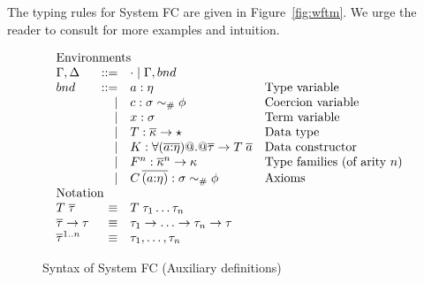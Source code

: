 \documentclass[a4paper,UKenglish]{lipics}
\newcommand{\psim}{\mathrel{\sim_{\tiny \#}}}
\newcommand{\static}{\textsf{$Constraint_{\#}$}}
\newcommand{\ol}[1]{\overline{#1}}
\newcommand{\bnd}{\mathop{bnd}}
\newcommand{\as}{\ol{a}}
\newcommand{\taus}{\ol{\tau}}
\begin{document}
The typing rules for System FC are given in Figure~\ref{fig:wftm}. We
urge the reader to consult \cite{sulzmann+:fc-paper,weirich+:fc2} for
more examples and intuition. 

\begin{figure}\small
\[\begin{array}{l} 
\begin{array}{lrll}
\multicolumn{3}{l}{\text{Environments}} \\
\Gamma,\Delta  & ::= & \cdot \mid \Gamma,\bnd \\
\bnd & ::=   %
             & a : \eta     & \text{Type variable} \\ 
     & \mid  & c : \sigma \psim \phi    & \text{Coercion variable}\\ 
     & \mid  & x : \sigma   & \text{Term variable}\\ 
     & \mid  & T : \ol{\kappa} \to \star & \text{Data type} \\
     & \mid  & K : \forall (\ol{a{:}\eta}) @.@ \taus \to T\;\as   & \text{Data constructor} \\
     & \mid  & F^n : \ol{\kappa}^n \to \kappa & \text{Type families (of arity $n$)} \\
     & \mid  & C \,\ol{(a{:}\eta)} : \sigma \psim \phi & \text{Axioms} \\
\multicolumn{3}{l}{\text{Notation}} \\ 
T\;\ol{\tau} & \equiv & T\;\tau_1 \ldots \tau_n \\
\taus \to \tau & \equiv & \tau_1 \to \ldots \to \tau_n \to \tau \\
\taus^{1..n} & \equiv & \tau_1,\ldots,\tau_n
\end{array}
\end{array}\] 
\caption{Syntax of System FC (Auxiliary definitions) }\label{fig:syntax3}
\end{figure}
\end{document}
